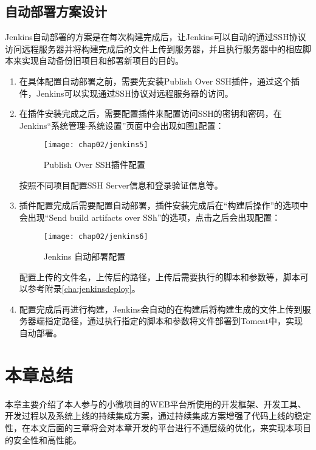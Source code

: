 \subsection{自动部署方案设计}

Jenkins自动部署的方案是在每次构建完成后，让Jenkins可以自动的通过SSH协议访问远程服务器并将构建完成后的文件上传到服务器，并且执行服务器中的相应脚本来实现自动备份旧项目和部署新项目的目的。

\begin{enumerate}
  \item 在具体配置自动部署之前，需要先安装Publish Over SSH插件，通过这个插件，Jenkins可以实现通过SSH协议对远程服务器的访问。
  \item 在插件安装完成之后，需要配置插件来配置访问SSH的密钥和密码，在Jenkins“系统管理-系统设置”页面中会出现如图\ref{fig:jenkins5}配置：
    \begin{figure}[H] %
      \centering
      \texttt{[image: chap02/jenkins5]}
      \caption{Publish Over SSH插件配置}
      \label{fig:jenkins5}
    \end{figure}
  按照不同项目配置SSH Server信息和登录验证信息等。
  \item 插件配置完成后需要配置自动部署，插件安装完成后在“构建后操作”的选项中会出现“Send build artifacts over SSh”的选项，点击之后会出现配置：
    \begin{figure}[H] %
      \centering
      \texttt{[image: chap02/jenkins6]}
      \caption{Jenkins 自动部署配置}
      \label{fig:jenkins6}
    \end{figure}
  配置上传的文件名，上传后的路径，上传后需要执行的脚本和参数等，脚本可以参考附录\ref{cha:jenkinsdeploy}。
  \item 配置完成后再进行构建，Jenkins会自动的在构建后将构建生成的文件上传到服务器端指定路径，通过执行指定的脚本和参数将文件部署到Tomcat中，实现自动部署。
\end{enumerate}

\section{本章总结}

本章主要介绍了本人参与的小微项目的WEB平台所使用的开发框架、开发工具、开发过程以及系统上线的持续集成方案，通过持续集成方案增强了代码上线的稳定性，在本文后面的三章将会对本章开发的平台进行不通层级的优化，来实现本项目的安全性和高性能。